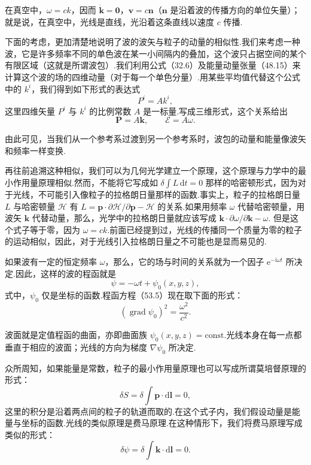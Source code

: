 在真空中，$\omega=ck$，因而 $\dot{\boldsymbol{k}}=\boldsymbol{0}$，$\boldsymbol{v}=c\boldsymbol{n}$（$\boldsymbol{n}$ 是沿着波的传播方向的单位矢量）；就是说，在真空中，光线是直线，光沿着这条直线以速度 $c$ 传播.

下面的考虑，更加清楚地说明了波的波矢与粒子的动量的相似性.我们来考虑一种波，它是许多频率不同的单色波在某一小间隔内的叠加，这个波只占据空间的某个有限区域（这就是所谓波包）.我们利用公式（32.6）及能量动量张量（48.15）来计算这个波的场的四维动量（对于每一个单色分量）.用某些平均值代替这个公式中的 $k^i$，我们得到如下形式的表达式
\begin{equation}
  P^i=Ak^i,
\end{equation}
这里四维矢量 $P^i$ 与 $k^i$ 的比例常数 $A$ 是一标量.写成三维形式，这个关系给出
\begin{equation}
  \boldsymbol{P}=A\boldsymbol{k},\qquad \mathcal{E}=A\omega.
\end{equation}

由此可见，当我们从一个参考系过渡到另一个参考系时，波包的动量和能量像波矢和频率一样变换.

再往前追溯这种相似，我们可以为几何光学建立一个原理，这个原理与力学中的最小作用量原理相似.然而，不能将它写成如 $\delta\int L\,\mathrm{d}t=0$ 那样的哈密顿形式，因为对于光线，不可能引入像粒子的拉格朗日量那样的函数.事实上，粒子的拉格朗日量 $L$ 与哈密顿量 $\mathcal{H}$ 有 $L=\boldsymbol{p}\cdot\partial\mathcal{H}/\partial\boldsymbol{p}-\mathcal{H}$ 的关系.如果用频率 $\omega$ 代替哈密顿量，用波矢 $\boldsymbol{k}$ 代替动量，那么，光学中的拉格朗日量就应该写成
$\boldsymbol{k}\cdot\partial\omega/\partial\boldsymbol{k}-\omega$. 但是这个式子等于零，因为 $\omega=ck$.前面已经提到过，光线的传播同一个质量为零的粒子的运动相似，因此，对于光线引入拉格朗日量之不可能也是显而易见的.

如果波有一定的恒定频率 $\omega$，那么，它的场与时间的关系就为一个因子 $\mathrm{e}^{-\mathrm{i}\omega t}$ 所决定.因此，这样的波的程函就是
\begin{equation}
  \psi=-\omega t+\psi_0(x,y,z),
\end{equation}
式中，$\psi_0$ 仅是坐标的函数.程函方程（53.5）现在取下面的形式：
\begin{equation}
  (\operatorname{grad}\psi_0)^2=\frac{\omega^2}{c^2}.
\end{equation}

波面就是定值程函的曲面，亦即曲面族 $\psi_0(x,y,z)=\mathrm{const}$.光线本身在每一点都垂直于相应的波面；光线的方向为梯度 $\nabla\psi_0$ 所决定.

众所周知，如果能量是常数，粒子的最小作用量原理也可以写成所谓莫培督原理的形式：
\begin{equation*}
  \delta S=\delta\int\boldsymbol{p}\cdot\mathrm{d}\boldsymbol{l}=0,
\end{equation*}
这里的积分是沿着两点间的粒子的轨道而取的.在这个式子内，我们假设动量是能量与坐标的函数.光线的类似原理是费马原理.在这种情形下，我们将费马原理写成类似的形式：
\begin{equation}
  \delta\psi=\delta\int\boldsymbol{k}\cdot\mathrm{d}\boldsymbol{l}=0.
\end{equation}

